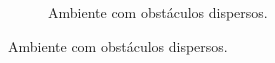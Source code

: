 \begin{figure}[h]
\begin{subfigure}[t]{0.45\textwidth}
    \caption{Ambiente com obstáculos dispersos.}
  \end{subfigure}


\end{figure}
